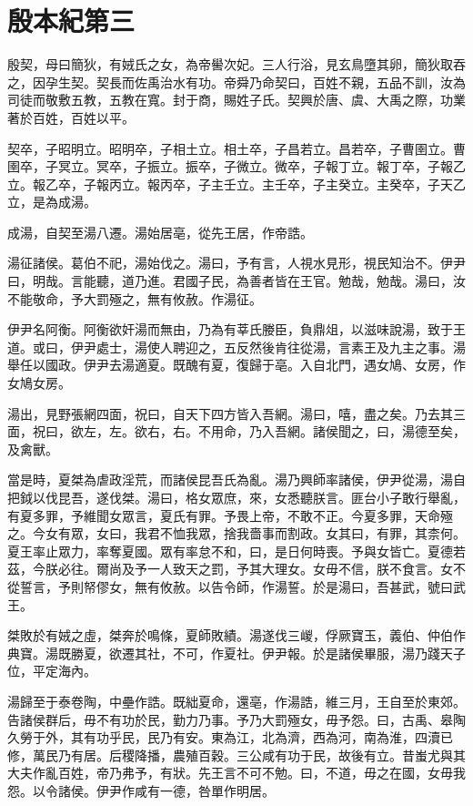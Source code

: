 \chapter{殷本紀第三}

殷契，母曰簡狄，有娀氏之女，為帝嚳次妃。三人行浴，見玄鳥墮其卵，簡狄取吞之，因孕生契。契長而佐禹治水有功。帝舜乃命契曰，百姓不親，五品不訓，汝為司徒而敬敷五教，五教在寬。封于商，賜姓子氏。契興於唐、虞、大禹之際，功業著於百姓，百姓以平。

契卒，子昭明立。昭明卒，子相土立。相土卒，子昌若立。昌若卒，子曹圉立。曹圉卒，子冥立。冥卒，子振立。振卒，子微立。微卒，子報丁立。報丁卒，子報乙立。報乙卒，子報丙立。報丙卒，子主壬立。主壬卒，子主癸立。主癸卒，子天乙立，是為成湯。

成湯，自契至湯八遷。湯始居亳，從先王居，作帝誥。

湯征諸侯。葛伯不祀，湯始伐之。湯曰，予有言，人視水見形，視民知治不。伊尹曰，明哉。言能聽，道乃進。君國子民，為善者皆在王官。勉哉，勉哉。湯曰，汝不能敬命，予大罰殛之，無有攸赦。作湯征。

伊尹名阿衡。阿衡欲奸湯而無由，乃為有莘氏媵臣，負鼎俎，以滋味說湯，致于王道。或曰，伊尹處士，湯使人聘迎之，五反然後肯往從湯，言素王及九主之事。湯舉任以國政。伊尹去湯適夏。既醜有夏，復歸于亳。入自北門，遇女鳩、女房，作女鳩女房。

湯出，見野張網四面，祝曰，自天下四方皆入吾網。湯曰，嘻，盡之矣。乃去其三面，祝曰，欲左，左。欲右，右。不用命，乃入吾網。諸侯聞之，曰，湯德至矣，及禽獸。

當是時，夏桀為虐政淫荒，而諸侯昆吾氏為亂。湯乃興師率諸侯，伊尹從湯，湯自把鉞以伐昆吾，遂伐桀。湯曰，格女眾庶，來，女悉聽朕言。匪台小子敢行舉亂，有夏多罪，予維聞女眾言，夏氏有罪。予畏上帝，不敢不正。今夏多罪，天命殛之。今女有眾，女曰，我君不恤我眾，捨我嗇事而割政。女其曰，有罪，其柰何。夏王率止眾力，率奪夏國。眾有率怠不和，曰，是日何時喪。予與女皆亡。夏德若茲，今朕必往。爾尚及予一人致天之罰，予其大理女。女毋不信，朕不食言。女不從誓言，予則帑僇女，無有攸赦。以告令師，作湯誓。於是湯曰，吾甚武，號曰武王。

桀敗於有娀之虛，桀奔於鳴條，夏師敗績。湯遂伐三嵕，俘厥寶玉，義伯、仲伯作典寶。湯既勝夏，欲遷其社，不可，作夏社。伊尹報。於是諸侯畢服，湯乃踐天子位，平定海內。

湯歸至于泰卷陶，中壘作誥。既絀夏命，還亳，作湯誥，維三月，王自至於東郊。告諸侯群后，毋不有功於民，勤力乃事。予乃大罰殛女，毋予怨。曰，古禹、皋陶久勞于外，其有功乎民，民乃有安。東為江，北為濟，西為河，南為淮，四瀆已修，萬民乃有居。后稷降播，農殖百穀。三公咸有功于民，故後有立。昔蚩尤與其大夫作亂百姓，帝乃弗予，有狀。先王言不可不勉。曰，不道，毋之在國，女毋我怨。以令諸侯。伊尹作咸有一德，咎單作明居。

